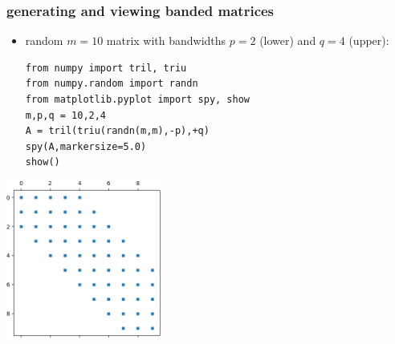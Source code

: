 \documentclass[10pt,
               svgnames,
               hyperref={colorlinks,citecolor=DeepPink4,linkcolor=FireBrick,urlcolor=Maroon},
               usepdftitle=false]{beamer}
\begin{document}
\begin{frame}[fragile]
\frametitle{generating and viewing banded matrices}

\begin{itemize}
\item random $m=10$ matrix with bandwidths $p=2$ (lower) and $q=4$ (upper):

\bigskip
\begin{verbatim}
from numpy import tril, triu
from numpy.random import randn
from matplotlib.pyplot import spy, show
m,p,q = 10,2,4
A = tril(triu(randn(m,m),-p),+q)
spy(A,markersize=5.0)
show()
\end{verbatim}
\end{itemize}

\vspace{-10mm}
\hfill \includegraphics[width=0.38\textwidth]{images/banded.png}
\end{frame}
\end{document}
